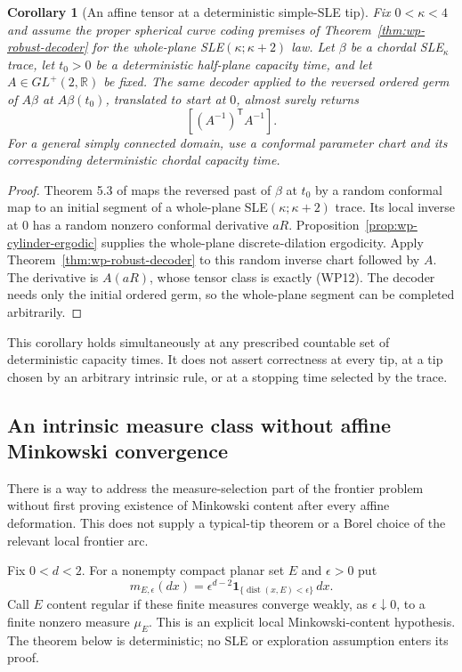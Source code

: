 \documentclass[11pt]{article}
\newtheorem{corollary}[theorem]{Corollary}
\theoremstyle{definition}\newtheorem{definition}[theorem]{Definition}
\theoremstyle{remark}\newtheorem{remark}[theorem]{Remark}
\newcommand{\RR}{\mathbb R}
\begin{document}
\begin{corollary}[An affine tensor at a deterministic simple-SLE tip]
\label{cor:wp-deterministic-tip-tensor}
Fix $0<\kappa<4$ and assume the proper spherical curve coding
premises of Theorem~\ref{thm:wp-robust-decoder} for the whole-plane
SLE$(\kappa;\kappa+2)$ law.  Let $\beta$ be a chordal SLE$_\kappa$
trace, let $t_0>0$ be a deterministic half-plane capacity time,
and let $A\in GL^+(2,\RR)$ be fixed.  The same decoder applied
to the reversed ordered germ of $A\beta$ at $A\beta(t_0)$,
translated to start at $0$, almost surely returns
\[
 [(A^{-1})^{\mathsf T}A^{-1}].
 \tag{WP12}
\]
For a general simply connected domain, use a conformal parameter
chart and its corresponding deterministic chordal capacity time.
\end{corollary}
\begin{proof}
Theorem 5.3 of \cite{zhan-tip} maps the reversed past of $\beta$
at $t_0$ by a random conformal map to an initial segment of a
whole-plane SLE$(\kappa;\kappa+2)$ trace.  Its local inverse at
$0$ has a random nonzero conformal derivative $aR$.
Proposition~\ref{prop:wp-cylinder-ergodic} supplies the whole-plane
discrete-dilation ergodicity.  Apply
Theorem~\ref{thm:wp-robust-decoder} to this random inverse chart
followed by $A$.  The derivative is $A(aR)$, whose tensor class
is exactly (WP12).  The decoder needs only the initial ordered
germ, so the whole-plane segment can be completed arbitrarily.
\end{proof}

This corollary holds simultaneously at any prescribed countable
set of deterministic capacity times.  It does not assert correctness
at every tip, at a tip chosen by an arbitrary intrinsic rule, or
at a stopping time selected by the trace.



\subsection{An intrinsic measure class without affine Minkowski convergence}
\label{sec:intrinsic-tube-measure}

There is a way to address the measure-selection part of the frontier
problem without first proving existence of Minkowski content after every
affine deformation. This does not supply a typical-tip theorem or a
Borel choice of the relevant local frontier arc.

Fix $0<d<2$. For a nonempty compact planar set $E$ and $\epsilon>0$ put
\[
 m_{E,\epsilon}(dx)=\epsilon^{d-2}
       \mathbf1_{\{\operatorname{dist}(x,E)<\epsilon\}}\,dx.
 \tag{IM1}
\]
Call $E$ content regular if these finite measures converge weakly, as
$\epsilon\downarrow0$, to a finite nonzero measure $\mu_E$.
This is an explicit local Minkowski-content hypothesis. The theorem below
is deterministic; no SLE or exploration assumption enters its proof.
\end{document}

